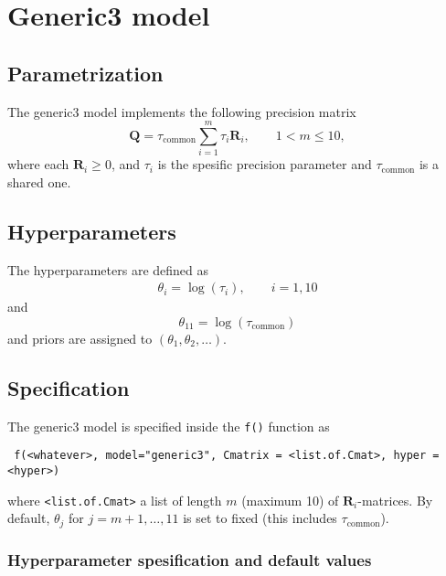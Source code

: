 \documentclass[a4paper,11pt]{article}
\def\mm#1{\ensuremath{\boldsymbol{#1}}} %
\begin{document}
\section*{Generic3 model}

\subsection*{Parametrization}

The generic3 model implements the following precision matrix
\begin{equation}\label{eq1}%
    \mathbf{Q}= \tau_{\text{common}} \sum_{i=1}^{m} \tau_i \mm{R}_i,
    \qquad 1 < m \le 10,
\end{equation}
where each $\mm{R}_i \ge 0$, and $\tau_i$ is the spesific precision
parameter and $\tau_{\text{common}}$ is a shared one.

\subsection*{Hyperparameters}

The hyperparameters are defined as 
\begin{eqnarray*}
    \theta_i = \log(\tau_i), \qquad i=1, 10
\end{eqnarray*}
and
\begin{displaymath}
    \theta_{11} = \log(\tau_{\text{common}})
\end{displaymath}
and priors are assigned to $(\theta_1,\theta_2, \ldots)$.

\subsection*{Specification}

The generic3 model is specified inside the {\tt f()} function as
\begin{verbatim}
 f(<whatever>, model="generic3", Cmatrix = <list.of.Cmat>, hyper = <hyper>)
\end{verbatim}
where {\tt <list.of.Cmat>} a list of length $m$ (maximum 10) of
$\mm{R}_i$-matrices. By default, $\theta_j$ for $j=m+1, \ldots, 11$ is
set to fixed (this includes $\tau_{\text{common}}$).


\subsubsection*{Hyperparameter spesification and default values}

\end{document}

